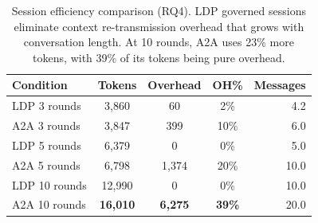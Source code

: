 \begin{table}[t]
\centering
\caption{Session efficiency comparison (RQ4). LDP governed sessions eliminate context re-transmission overhead that grows with conversation length. At 10 rounds, A2A uses 23\% more tokens, with 39\% of its tokens being pure overhead.}
\label{tab:sessions}
\begin{tabular}{lcccr}
\toprule
Condition & Tokens & Overhead & OH\% & Messages \\
\midrule
LDP 3 rounds & 3,860 & 60 & 2\% & 4.2 \\
A2A 3 rounds & 3,847 & 399 & 10\% & 6.0 \\
\midrule
LDP 5 rounds & 6,379 & 0 & 0\% & 5.0 \\
A2A 5 rounds & 6,798 & 1,374 & 20\% & 10.0 \\
\midrule
LDP 10 rounds & 12,990 & 0 & 0\% & 10.0 \\
A2A 10 rounds & \textbf{16,010} & \textbf{6,275} & \textbf{39\%} & 20.0 \\
\bottomrule
\end{tabular}
\end{table}
